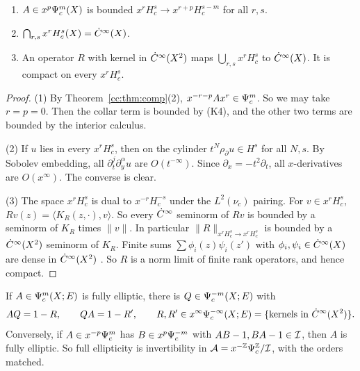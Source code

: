 \begin{lemma}\label{cc:lem:sobolev}
\begin{enumerate}
\item \(A\in x^p\Psi_{c}^m(X)\) is bounded \(x^rH^s_c\to x^{r+p}H^{s-m}_c\)
for all \(r,s\).
\item \(\bigcap_{r,s}x^rH^s_c(X)=\dot C^\infty(X)\).
\item An operator \(R\) with kernel in \(\dot C^\infty(X^2)\) maps
\(\bigcup_{r,s}x^rH^s_c\) to \(\dot C^\infty(X)\). It is compact on every
\(x^rH^s_c\).
\end{enumerate}
\end{lemma}

\begin{proof}
(1) By Theorem~\ref{cc:thm:comp}(2), \(x^{-r-p}Ax^r\in\Psi_{c}^m\). So we may
take \(r=p=0\). Then the collar term is bounded by (K4), and the other two
terms are bounded by the interior calculus.

(2) If \(u\) lies in every \(x^rH^s_c\), then on the cylinder
\(t^N\rho_\partial u\in H^s\) for all \(N,s\). By Sobolev embedding,
all \(\partial_t^j\partial_y^\alpha u\) are \(O(t^{-\infty})\). Since
\(\partial_x=-t^2\partial_t\), all \(x\)-derivatives are \(O(x^\infty)\).
The converse is clear.

(3) The space \(x^rH^s_c\) is dual to \(x^{-r}H^{-s}_c\) under the
\(L^2(\nu_c)\) pairing. For \(v\in x^rH^s_c\),
\(Rv(z)=\langle K_R(z,\cdot),v\rangle\). So every \(\dot C^\infty\) seminorm of
\(Rv\) is bounded by a seminorm of \(K_R\) times \(\|v\|\). In particular
\(\|R\|_{x^rH^s_c\to x^rH^s_c}\) is bounded by a \(\dot C^\infty(X^2)\) seminorm
of \(K_R\). Finite sums \(\sum\phi_i(z)\psi_i(z')\) with
\(\phi_i,\psi_i\in\dot C^\infty(X)\) are dense in \(\dot C^\infty(X^2)\) \cite{Treves}. So
\(R\) is a norm limit of finite rank operators, and hence compact.
\end{proof}

\begin{theorem}[Parametrix]\label{cc:thm:parametrix}
If \(A\in\Psi_{c}^m(X;E)\) is fully elliptic, there is \(Q\in
\Psi_{c}^{-m}(X;E)\) with
\[
 AQ=1-R,\qquad QA=1-R',\qquad R,R'\in x^\infty\Psi_{c}^{-\infty}(X;E)
 =\{\text{kernels in }\dot C^\infty(X^2)\}.
\]
Conversely, if \(A\in x^{-p}\Psi_{c}^m\) has \(B\in x^p\Psi_{c}^{-m}\) with
\(AB-1,BA-1\in\mathcal I\), then \(A\) is fully elliptic. So full ellipticity is
invertibility in \(\mathcal A=x^{-\mathbb Z}\Psi_{c}^{\mathbb Z}/\mathcal I\), with the orders matched.
\end{theorem}

